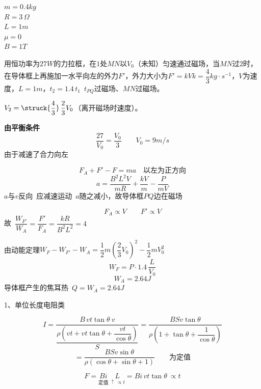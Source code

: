 \begin{problem}

\noindent $m=0.4\unit{kg}$\\
$R=3\,\Omega$\\
$L=1\unit{m}$\\
$\mu=0$\\
$B=1\unit{T}$

用恒功率为$27\unit{W}$的力拉框，在$1$处$MN$以$V_0$（未知）匀速通过磁场，当$MN$过$2$时，在导体框上再施加一水平向左的外力$F'$，外力大小为$F'=kV$\quad $k=\dfrac{4}{3}\unit{kg\cdot s^{-1}}$，$V$为速度，$L=1\unit{m}$，{\small $t_2=1.4\,t_1$}\ $t_{PQ}$过磁场、$MN$过磁场。
\par\smallskip
$V_2=\struck{\dfrac{4}{3}}\,\dfrac{2}{3}V_0$（离开磁场时速度）。
\begin{solution}
\textbf{由平衡条件}
\[
\frac{27}{V_0}=\frac{V_0}{3}\qquad V_0=9\unit{m/s}
\]
\hfill {\small 由于减速了合力向左}\par %
\[
F_A+F'-F=ma\quad\text{以左为正方向}
\]
\[
a=\frac{B^2L^2V}{mR}+\frac{kV}{m}-\frac{P}{mV}
\]
$a$与$v$反向\ 应减速运动\ $a$随之减小，故导体框$PQ$边在磁场%

\[
F_A\propto V\qquad F'\propto V
\]
故\ $\dfrac{W_{F'}}{W_A}=\dfrac{F'}{F_A}=\dfrac{kR}{B^2L^2}=4$

由动能定理\quad $W_F-W_{F'}-W_A=\dfrac{1}{2}m\left(\dfrac{2}{3}V_0\right)^2-\dfrac{1}{2}mV_0^2$
\[
W_F=P\cdot 1.4\,\frac{L}{V_0}
\]
\[
W_A=2.64\unit{J}
\]
导体框产生的焦耳热\ $Q=W_A=2.64\unit{J}$
\end{solution}
\end{problem}
1、单位长度电阻类


\[
I=\frac{B\,vt\tan\theta\ v}{\dfrac{\rho\left(vt+vt\tan\theta+\dfrac{vt}{\cos\theta}\right)}{S}}
=\frac{BSv\tan\theta}{\rho\left(1+\tan\theta+\dfrac{1}{\cos\theta}\right)}
\]
\[
=\frac{BSv\sin\theta}{\rho(\cos\theta+\sin\theta+1)}\qquad\text{为定值}
\]

\[
F=\underset{\text{定值}}{Bi}\ \underset{\uparrow\ \propto t}{L}=Bi\,vt\tan\theta\ \propto t
\]

